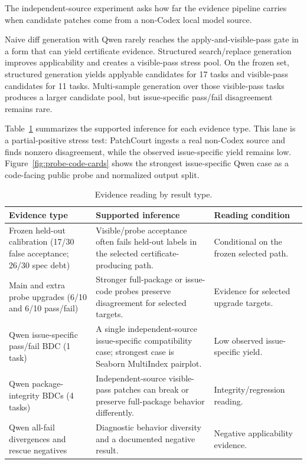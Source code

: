 \documentclass[conference]{IEEEtran}
\newcommand{\patchcourt}{PatchCourt\xspace}
\begin{document}
The independent-source experiment asks how far the evidence pipeline carries when candidate patches come from a non-Codex local model source.

Naive diff generation with Qwen rarely reaches the apply-and-visible-pass gate in a form that can yield certificate evidence.
Structured search/replace generation improves applicability and creates a visible-pass stress pool.
On the frozen set, structured generation yields applyable candidates for 17 tasks and visible-pass candidates for 11 tasks.
Multi-sample generation over those visible-pass tasks produces a larger candidate pool, but issue-specific pass/fail disagreement remains rare.

Table~\ref{tab:claim-boundary} summarizes the supported inference for each evidence type.
This lane is a partial-positive stress test: \patchcourt ingests a real non-Codex source and finds nonzero disagreement, while the observed issue-specific yield remains low.
Figure~\ref{fig:probe-code-cards} shows the strongest issue-specific Qwen case as a code-facing public probe and normalized output split.

\begin{table}[t]
\caption{Evidence reading by result type.}
\label{tab:claim-boundary}
\centering
\begin{tabularx}{\textwidth}{lXX}
\toprule
Evidence type & Supported inference & Reading condition \\
\midrule
Frozen held-out calibration (17/30 false acceptance; 26/30 spec debt) & Visible/probe acceptance often fails held-out labels in the selected certificate-producing path. & Conditional on the frozen selected path. \\
Main and extra probe upgrades (6/10 and 6/10 pass/fail) & Stronger full-package or issue-code probes preserve disagreement for selected targets. & Evidence for selected upgrade targets. \\
Qwen issue-specific pass/fail BDC (1 task) & A single independent-source issue-specific compatibility case; strongest case is Seaborn MultiIndex pairplot. & Low observed issue-specific yield. \\
Qwen package-integrity BDCs (4 tasks) & Independent-source visible-pass patches can break or preserve full-package behavior differently. & Integrity/regression reading. \\
Qwen all-fail divergences and rescue negatives & Diagnostic behavior diversity and a documented negative result. & Negative applicability evidence. \\
\bottomrule
\end{tabularx}
\end{table}
\end{document}
